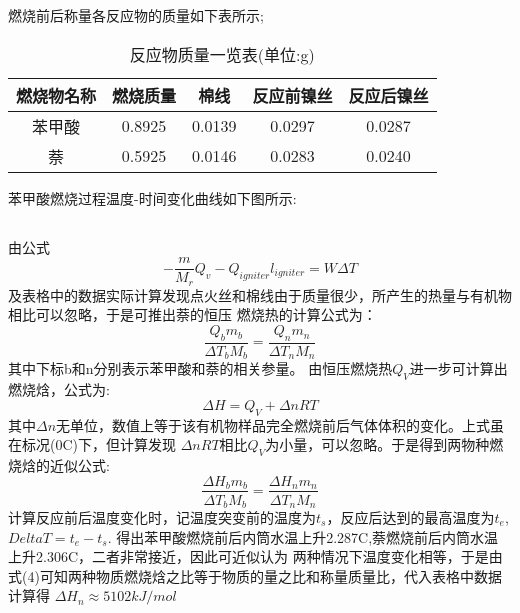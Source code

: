 ﻿\documentclass[10.5pt]{article}
\begin{document}
\section{\textbf{}}
\subsection{\textbf{}}
燃烧前后称量各反应物的质量如下表所示;
\begin{table}[!ht]
\centering
\caption{反应物质量一览表(单位:g)}
\begin{tabular}{ccccc}
\hline
燃烧物名称 & 燃烧质量& 棉线 & 反应前镍丝 & 反应后镍丝\\
\hline
苯甲酸 & 0.8925 & 0.0139 & 0.0297 & 0.0287\\
萘 & 0.5925 & 0.0146 & 0.0283 & 0.0240 \\
\hline
\end{tabular}
\end{table}
苯甲酸燃烧过程温度-时间变化曲线如下图所示:

\begin{figure}[!ht]
  \centering
\end{figure}

\subsection{\textbf{}}


由公式
\begin{equation}
-\frac{m}{M_r}Q_v-Q_{igniter}l_{igniter}=W\Delta T
\end{equation}
及表格中的数据实际计算发现点火丝和棉线由于质量很少，所产生的热量与有机物相比可以忽略，于是可推出萘的恒压
燃烧热的计算公式为：
\begin{equation}
\frac{Q_b m_b}{\Delta T_b M_b}=\frac{Q_n m_n}{\Delta T_n M_n}
\end{equation}
其中下标b和n分别表示苯甲酸和萘的相关参量。
由恒压燃烧热$Q_V$进一步可计算出燃烧焓，公式为:
\begin{equation}
\Delta H=Q_V+\Delta n R T
\end{equation}
其中$\Delta n$无单位，数值上等于该有机物样品完全燃烧前后气体体积的变化。上式虽在标况(0\degree C)下，但计算发现 $\Delta n RT$相比$Q_V$为小量，可以忽略。于是得到两物种燃烧焓的近似公式:
\begin{equation}
\frac{{\Delta H}_b m_b}{\Delta T_b M_b}=\frac{{\Delta H}_n m_n}{\Delta T_n M_n}
\end{equation}
计算反应前后温度变化时，记温度突变前的温度为$t_s$，反应后达到的最高温度为$t_e$,$Delta T=t_e-t_s$.
得出苯甲酸燃烧前后内筒水温上升2.287\degree C,萘燃烧前后内筒水温上升2.306\degree C，二者非常接近，因此可近似认为
两种情况下温度变化相等，于是由式(4)可知两种物质燃烧焓之比等于物质的量之比和称量质量比，代入表格中数据计算得
${\Delta H}_n \approx 5102 kJ/mol $
\end{document}
